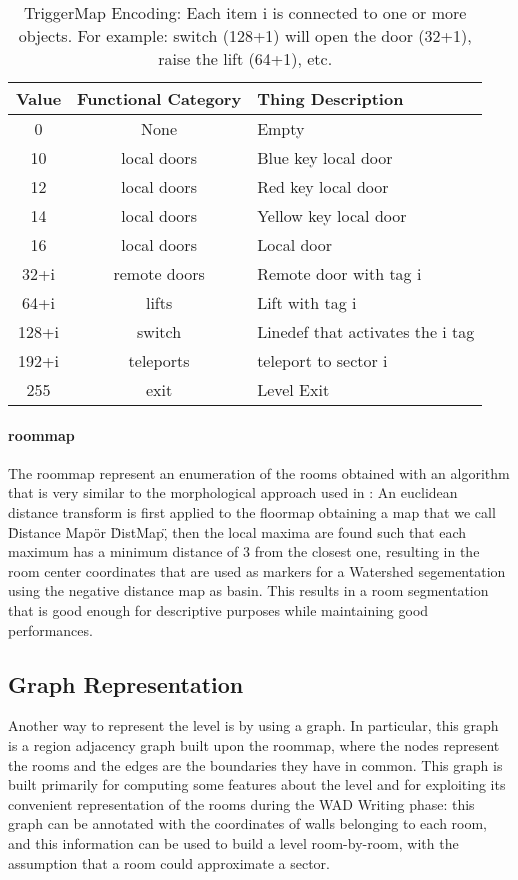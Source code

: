 \begin{table}
\begin{tabularx}{\textwidth}{| c | c | X | }
	\hline
	\textbf{Value} & \textbf{Functional Category} & \textbf{Thing Description} \\
	\hline
	0 &	None &	Empty \\
	10 &	local doors	 & Blue key local door \\
	12 &	local doors & Red key local door \\
	14 &	local doors	 & Yellow key local door \\
	16 &	local doors & Local door \\
	32+i &	remote doors &	Remote door with tag i \\
	64+i &	lifts &	Lift with tag i \\
	128+i &	switch &	Linedef that activates the i tag \\
	192+i &	teleports &	teleport to sector i \\
	255 &	exit &	Level Exit \\
	\hline
\end{tabularx}
\caption[TriggerMap Encoding]{TriggerMap Encoding: Each item i is connected to one or more objects. For example: switch (128+1) will open the door (32+1), raise the lift (64+1), etc.}
\label{tab:triggermap}
\end{table}

\paragraph{\gls{roommap}} The \gls{roommap} represent an enumeration of the rooms obtained with an algorithm that is very similar to the morphological approach used in \cite{7487234}: An euclidean distance transform \cite{edt} is first applied to the \gls{floormap} obtaining a map that we call \"Distance Map\" or \"DistMap\", then the local maxima are found \cite{localmax} such that each maximum has a minimum distance of 3 from the closest one, resulting in the room center coordinates that are used as markers for a Watershed segementation \cite{watershed} using the negative distance map as basin. This results in a room segmentation that is good enough for descriptive purposes while maintaining good performances.

\subsection{Graph Representation}
Another way to represent the level is by using a graph. In particular, this graph is a region adjacency graph \cite{Trémeau00regionsadjacency} built upon the \gls{roommap}, where the nodes represent the rooms and the edges are the boundaries they have in common. This graph is built primarily for computing some features about the level and for exploiting its convenient representation of the rooms during the WAD Writing phase: this graph can be annotated with the coordinates of walls belonging to each room, and this information can be used to build a level room-by-room, with the assumption that a room could approximate a sector.


